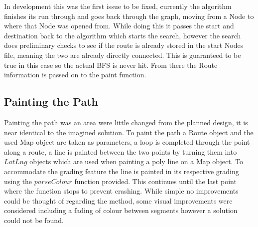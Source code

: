 In development this was the first issue to be fixed, currently the algorithm finishes its run through and goes back through the graph, moving from a Node to where that Node was opened from. While doing this it passes the start and destination back to the algorithm which starts the search, however the search does preliminary checks to see if the route is already stored in the start Nodes file, meaning the two are already directly connected. This is guaranteed to be true in this case so the actual BFS is never hit. From there the Route information is passed on to the paint function. 

\subsection{Painting the Path}
Painting the path was an area were little changed from the planned design, it is near identical to the imagined solution. To paint the path a Route object and the used Map object are taken as parameters, a loop is completed through the point along a route, a line is painted between the two points by turning them into $LatLng$ objects which are used when painting a poly line on a Map object. To accommodate the grading feature the line is painted in its respective grading using the $parseColour$ function provided. This continues until the last point where the function stops to prevent crashing. While simple no improvements could be thought of regarding the method, some visual improvements were considered including a fading of colour between segments however a solution could not be found. 